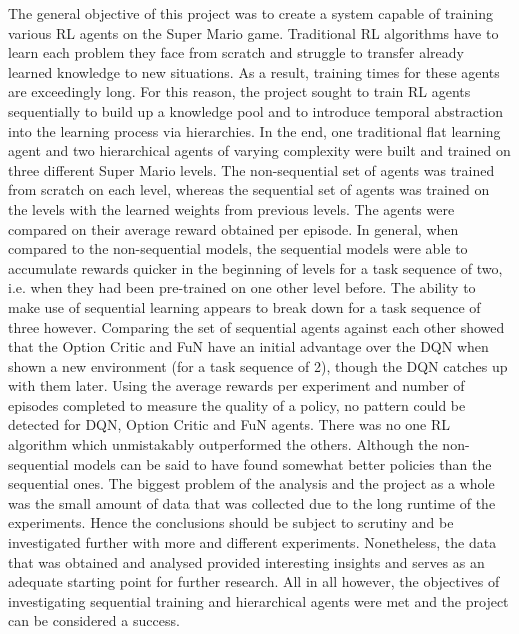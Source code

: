 \documentclass[notitlepage,a4paper,11pt]{article}
\begin{document}
The general objective of this project was to create a system capable of training various RL agents on the Super Mario game. Traditional RL algorithms have to learn each problem they face from scratch and struggle to transfer already learned knowledge to new situations. As a result, training times for these agents are exceedingly long. For this reason, the project sought to train RL agents sequentially to build up a knowledge pool and to introduce temporal abstraction into the learning process via hierarchies. In the end, one traditional flat learning agent and two hierarchical agents of varying complexity were built and trained on three different Super Mario levels. The non-sequential set of agents was trained from scratch on each level, whereas the sequential set of agents was trained on the levels with the learned weights from previous levels. The agents were compared on their average reward obtained per episode. In general, when compared to the non-sequential models, the sequential models were able to accumulate rewards quicker in the beginning of levels for a task sequence of two, i.e. when they had been pre-trained on one other level before. The ability to make use of sequential learning appears to break down for a task sequence of three however. Comparing the set of sequential agents against each other showed that the Option Critic and FuN have an initial advantage over the DQN when shown a new environment (for a task sequence of 2), though the DQN catches up with them later. Using the average rewards per experiment and number of episodes completed to measure the quality of a policy, no pattern could be detected for DQN, Option Critic and FuN agents. There was no one RL algorithm which unmistakably outperformed the others. Although the non-sequential models can be said to have found somewhat better policies than the  sequential ones. The biggest problem of the analysis and the project as a whole was the small amount of data that was collected due to the long runtime of the experiments. Hence the conclusions should be subject to scrutiny and be investigated further with more and different experiments. Nonetheless, the data that was obtained and analysed provided interesting insights and serves as an adequate starting point for further research. All in all however, the objectives of investigating sequential training and hierarchical agents were met and the project can be considered a success.

\pagebreak



\end{document}

